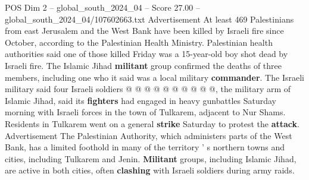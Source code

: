\begin{textsample}{POS Dim 2 – global\_south\_2024\_04 – Score 27.00 – global\_south\_2024\_04/107602663.txt}
Advertisement At least 469 Palestinians from east Jerusalem and the West Bank have been killed by Israeli fire since October, according to the Palestinian Health Ministry.
Palestinian health authorities said one of those killed Friday was a 15-year-old boy shot dead by Israeli fire.
The Islamic Jihad \textbf{militant} group confirmed the deaths of three members, including one who it said was a local military \textbf{commander}.
The Israeli military said four Israeli soldiers @ @ @ @ @ @ @ @ @ @, the military arm of Islamic Jihad, said its \textbf{fighters} had engaged in heavy gunbattles Saturday morning with Israeli forces in the town of Tulkarem, adjacent to Nur Shams.
Residents in Tulkarem went on a general \textbf{strike} Saturday to protest the \textbf{attack}.
Advertisement The Palestinian Authority, which administers parts of the West Bank, has a limited foothold in many of the territory ' s northern towns and cities, including Tulkarem and Jenin. \textbf{Militant} groups, including Islamic Jihad, are active in both cities, often \textbf{clashing} with Israeli soldiers during army raids.

\end{textsample}

